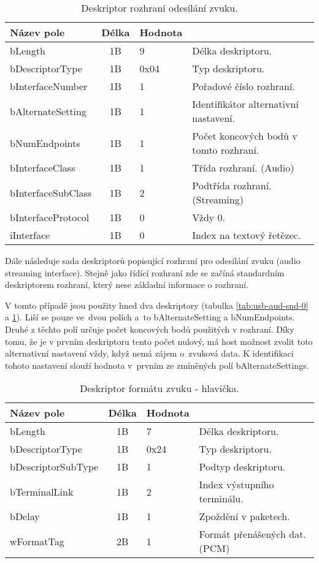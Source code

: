 \begin{table}[ht!]
\begin{center}
\begin{tabular}{|l|c|l|l|}
\hline 
Název pole & Délka & Hodnota &  \\ 
\hline
bLength & 1B & 9 & Délka deskriptoru.\\
\hline
bDescriptorType & 1B & 0x04 & Typ deskriptoru. \\
\hline
bInterfaceNumber & 1B & 1 & Pořadové číslo rozhraní.\\
\hline
bAlternateSetting & 1B & 1 & Identifikátor alternativní nastavení.\\
\hline
bNumEndpoints & 1B & 1 & Počet koncových bodů v tomto rozhraní.\\
\hline
bInterfaceClass & 1B & 1 & Třída rozhraní. (Audio)\\
\hline
bInterfaceSubClass & 1B & 2 & Podtřída rozhraní. (Streaming)\\
\hline
bInterfaceProtocol & 1B & 0 & Vždy 0. \\
\hline
iInterface & 1B & 0 & Index na textový řetězec.\\
\hline
\end{tabular} 
\end{center}
\caption{Deskriptor rozhraní odesílání zvuku.}
\label{tab:usb-aud-snd} 
\end{table}

Dále následuje sada deskriptorů popisující rozhraní pro odesílání zvuku (audio streaming interface). Stejně jako řídící rozhraní zde se začíná standardním  deskriptorem rozhraní, který nese základní informace o rozhraní.

V tomto případě jsou použity hned dva deskriptory (tabulka \ref{tab:usb-aud-snd-0} a \ref{tab:usb-aud-snd}). Liší se pouze ve~dvou polích a~to   bAlternateSetting a bNumEndpoints. Druhé z těchto polí určuje počet koncových bodů použitých v rozhraní. Díky tomu, že je v prvním deskriptoru tento počet nulový, má host možnost zvolit toto alternativní nastavení vždy, když nemá zájem o~zvuková data. K identifikaci tohoto nastavení slouží hodnota v~prvním ze zmíněných polí bAlternateSettings.

\begin{table}[ht!]
\begin{center}
\begin{tabular}{|l|c|l|l|}
\hline 
Název pole & Délka & Hodnota &  \\ 
\hline
bLength & 1B & 7 & Délka deskriptoru.\\
\hline
bDescriptorType & 1B & 0x24 & Typ deskriptoru. \\
\hline
bDescriptorSubType & 1B & 1 & Podtyp deskriptoru. \\
\hline
bTerminalLink & 1B & 2 & Index výstupního terminálu.\\ 
\hline
bDelay & 1B & 1 & Zpoždění v paketech.\\ 
\hline
wFormatTag & 2B & 1 & Formát přenášených dat. (PCM)\\ 
\hline
\end{tabular} 
\end{center}
\caption{Deskriptor formátu zvuku - hlavička.}
\label{tab:usb-aud-snd-fmt-head} 
\end{table}

